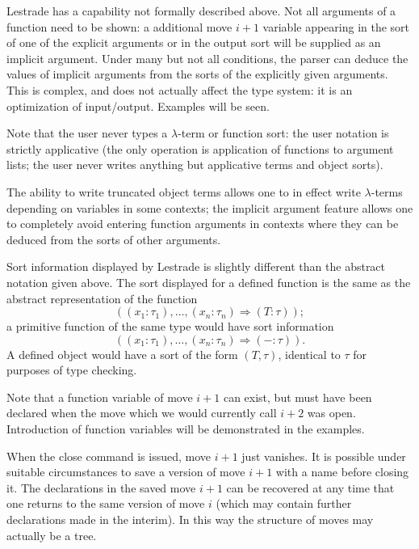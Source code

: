 \documentclass[12pt]{slides}
\begin{document}
\begin{slide}

Lestrade has a capability not formally described above.  Not all arguments of a function need to be shown:  a additional move $i+1$ variable appearing in the sort of one of the explicit arguments or in the output sort will be supplied as an implicit argument.  Under many but not all conditions, the parser can deduce the values of implicit arguments from the sorts of the explicitly given arguments.  This is complex, and does not actually affect the type system:  it is an optimization of input/output.  Examples will be seen.

\end{slide}

\begin{slide}

Note that the user never types a $\lambda$-term or function sort:  the user notation is strictly applicative (the only operation is application of functions to argument lists; the user never writes anything but applicative terms and object sorts). 

The ability to write truncated object terms allows one to in effect write $\lambda$-terms depending on variables in some contexts; the implicit argument feature allows one to completely
avoid entering function arguments in contexts where they can be deduced from the sorts of other arguments.

\end{slide}

\begin{slide}

Sort information displayed by Lestrade is slightly different than the abstract notation given above.  The sort displayed for a defined function is the same as the abstract representation of the function $$((x_1:\tau_1),\ldots,(x_n:\tau_n) \Rightarrow (T:\tau));$$  a primitive function of the same type would have sort information
$$((x_1:\tau_1),\ldots,(x_n:\tau_n) \Rightarrow (-:\tau)).$$  A defined object would have a sort of the form $(T,\tau)$, identical to $\tau$ for purposes of type checking.

\end{slide}

\begin{slide}


Note that a function variable of move $i+1$ can exist, but must have been declared when the move which we would currently call $i+2$ was open.
Introduction of function variables will be demonstrated in the examples.

When the close command is issued, move $i+1$ just vanishes.  It is possible under suitable circumstances to save a version of move $i+1$ with a name before closing it.  The declarations in the saved move $i+1$ can be recovered at any time that one returns to the same version of move $i$ (which may contain further declarations made in the interim).  In this way the structure of moves may actually be a tree.


\end{slide}
\end{document}
